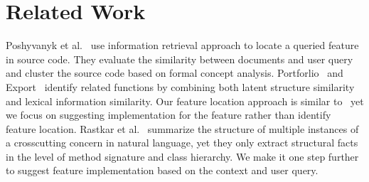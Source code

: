 
\section{Related Work}
%
  Poshyvanyk et al.~\cite{Denys:FCA12} use information retrieval approach to locate a queried feature in source code. They  evaluate the similarity between documents and user query and cluster the source code based on formal concept analysis.  Portforlio~\cite{Portfolio:DenysICSE11} and Export~\cite{Export:DenysASE13} identify related functions by combining both latent structure similarity and lexical information similarity. Our feature location approach is similar to~\cite{Portfolio:DenysICSE11} yet we focus on suggesting implementation for the feature rather than identify feature location.
Rastkar et al.~\cite{Murphy:nlConcern11} summarize the structure of multiple instances of a crosscutting concern in natural language, yet they only extract structural facts in the level of method signature and class hierarchy. We make it one step further to suggest feature implementation based on the context and user query.

